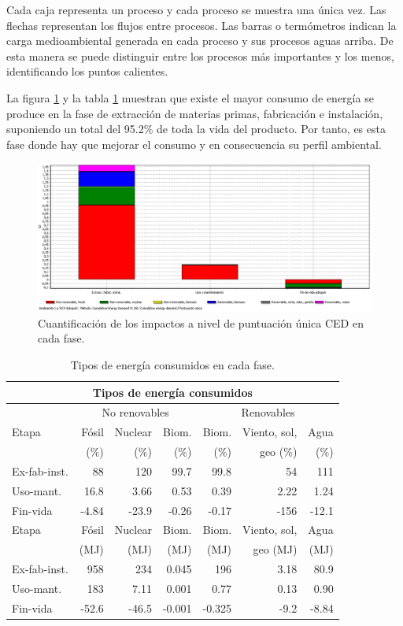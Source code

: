Cada caja representa un proceso y cada proceso se muestra una única vez. Las flechas representan los flujos entre procesos. Las barras o termómetros indican la carga medioambiental generada en cada proceso y sus procesos aguas arriba. De esta manera se puede distinguir entre los procesos más importantes y los menos, identificando los puntos calientes.

La figura \ref{fig:ced_puntuacionunica} y la tabla \ref{tiposenergiaced} muestran que existe el mayor consumo de energía se produce en la fase de extracción de materias primas, fabricación e instalación, suponiendo un total del 95.2\% de toda la vida del producto. Por tanto, es esta fase donde hay que mejorar el consumo y en consecuencia su perfil ambiental.

\begin{figure}[!htb]
\centering
\includegraphics[width=15cm]{img/ced_puntuacionunica.png}
\caption{Cuantificación de los impactos a nivel de puntuación única CED en cada fase.}
\label{fig:ced_puntuacionunica}
\end{figure}

\begin{table}[!htb]
\centering
\begin{tabular}{p{2cm}rrrrrr}
\toprule
\multicolumn{7}{c}{Tipos de energía consumidos}\\
\midrule
 & \multicolumn{3}{c}{No renovables} & \multicolumn{3}{c}{Renovables}\\
\midrule
Etapa & Fósil & Nuclear & Biom. & Biom. & Viento, sol,& Agua\\
 & (\%) & (\%) & (\%) & (\%) & geo (\%) & (\%)\\
\midrule
Ex-fab-inst. & 88 & 120 & 99.7 & 99.8 & 54 & 111\\
Uso-mant. & 16.8 & 3.66 & 0.53 & 0.39 & 2.22 & 1.24\\
Fin-vida & -4.84 & -23.9 & -0.26 & -0.17 & -156 & -12.1\\
\midrule
\midrule
Etapa & Fósil & Nuclear & Biom. & Biom. & Viento, sol,& Agua\\
& (\si{MJ}) & (\si{MJ}) & (\si{MJ}) & (\si{MJ}) & geo (\si{MJ}) & (\si{MJ})\\
\midrule
Ex-fab-inst. & 958 & 234 & 0.045 & 196 & 3.18 & 80.9\\
Uso-mant. & 183 & 7.11 & 0.001 & 0.77 & 0.13 & 0.90\\
Fin-vida & -52.6 & -46.5 & -0.001 & -0.325 & -9.2 & -8.84\\
\bottomrule
\end{tabular}
\caption{Tipos de energía consumidos en cada fase.}
\label{tiposenergiaced}
\end{table}

